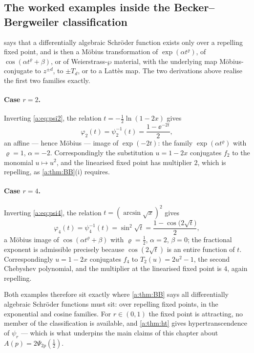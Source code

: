 \subsection{The worked examples inside the Becker--Bergweiler classification}
\label{a:app:classification}

 says that a differentially algebraic Schröder function exists only
over a repelling fixed point, and is then a Möbius transformation of
$\exp(\alpha t^{\varrho})$, of $\cos(\alpha t^{\varrho}+\beta)$, or of
Weierstrass-$\wp$ material, with the underlying map Möbius-conjugate to $z^{\pm d}$,
to $\pm T_d$, or to a Lattès map. The two derivations above realise the first two
families exactly.

\paragraph{Case $r=2$.}
Inverting \cref{a:eq:psi2}, the relation $t = -\tfrac12\ln(1-2x)$ gives
\begin{equation*}
\varphi_2(t) = \psi_2^{-1}(t) = \frac{1-\ee^{-2t}}{2},
\end{equation*}
an affine --- hence Möbius --- image of $\exp(-2t)$: the family
$\exp(\alpha t^{\varrho})$ with $\varrho=1$, $\alpha=-2$. Correspondingly the
substitution $u=1-2x$ conjugates $f_2$ to the monomial $u\mapsto u^2$, and the
linearised fixed point has multiplier $2$, which is repelling, as
\cref{a:thm:BB}(i) requires.

\paragraph{Case $r=4$.}
Inverting \cref{a:eq:psi4}, the relation $t = (\arcsin\sqrt x)^2$ gives
\begin{equation*}
\varphi_4(t) = \psi_4^{-1}(t) = \sin^2\!\sqrt t = \frac{1-\cos\bigl(2\sqrt t\bigr)}{2},
\end{equation*}
a Möbius image of $\cos(\alpha t^{\varrho}+\beta)$ with $\varrho=\tfrac12$,
$\alpha=2$, $\beta=0$; the fractional exponent is admissible precisely because
$\cos(2\sqrt t)$ is an entire function of $t$. Correspondingly $u=1-2x$ conjugates
$f_4$ to $T_2(u) = 2u^2-1$, the second Chebyshev polynomial, and the multiplier at
the linearised fixed point is $4$, again repelling.

Both examples therefore sit exactly where \cref{a:thm:BB} says all differentially
algebraic Schröder functions must sit: over repelling fixed points, in the
exponential and cosine families. For $r\in(0,1)$ the fixed point is attracting, no
member of the classification is available, and \cref{a:thm:ht} gives
hypertranscendence of $\psi_r$ --- which is what underpins the main claims of this
chapter about $A(p) = 2\Psi_{2p}(\tfrac12)$.

